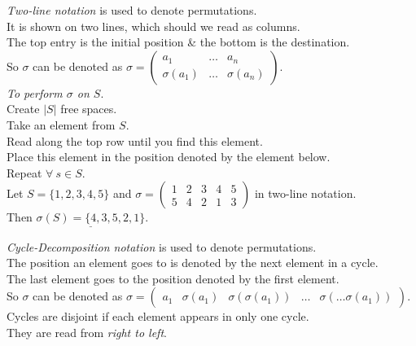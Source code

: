 \documentclass[11pt,a4paper]{article}
\begin{document}

\textit{Two-line notation} is used to denote permutations.\\
It is shown on two lines, which should we read as columns.\\
The top entry is the initial position \& the bottom is the destination.\\
So $\sigma$ can be denoted as $\sigma = \begin{pmatrix} a_1 & \dots & a_n \\ \sigma(a_1) & \dots & \sigma(a_n) \end{pmatrix}$.\\

\textit{To perform $\sigma$ on $S$}.\\
Create $|S|$ free spaces.\\
Take an element from $S$.\\
Read along the top row until you find this element.\\
Place this element in the position denoted by the element below.\\
Repeat $\forall\ s \in S$.\\

Let $S = \{1,2,3,4,5 \}$ and $\sigma = \begin{pmatrix}1 & 2 & 3 & 4 & 5 \\5 & 4 & 2 & 1 & 3 \end{pmatrix}$ in two-line notation.\\
Then $\underline{\sigma(S) = \{4,3,5,2,1 \}}$.\\

\newpage{}

\textit{Cycle-Decomposition notation} is used to denote permutations.\\
The position an element goes to is denoted by the next element in a cycle.\\
The last element goes to the position denoted by the first element.\\
So $\sigma$ can be denoted as $\sigma = \begin{pmatrix} a_1 & \sigma(a_1) & \sigma(\sigma(a_1)) & \dots & \sigma(\dots\sigma(a_1))\end{pmatrix}$.\\
Cycles are disjoint if each element appears in only one cycle.\\
They are read from \textit{right to left}.\\
\end{document}
